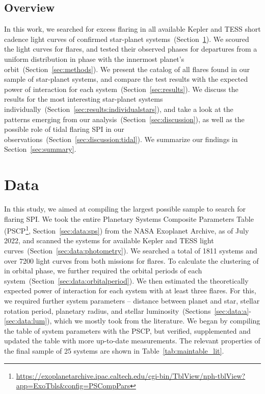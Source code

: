 \documentclass[twocolumn]{aastex631}
\begin{document}
\subsection{Overview}
In this work, we searched for excess flaring in all available Kepler and TESS short cadence light curves of confirmed star-planet systems~(Section~\ref{sec:data}). We scoured the light curves for flares, and tested their observed phases for departures from a uniform distribution in phase with the innermost planet's orbit~(Section~\ref{sec:methods}). We present the catalog of all flares found in our sample of star-planet systems, and compare the test results with the expected power of interaction for each system~(Section~\ref{sec:results}). We discuss the results for the most interesting star-planet systems individually~(Section~\ref{sec:results:individualstars}), and take a look at the patterns emerging from our analysis~(Section~\ref{sec:discussion}), as well as the possible role of tidal flaring SPI in our observations~(Section~\ref{sec:discussion:tidal}).  We summarize our findings in Section~\ref{sec:summary}. 




\section{Data}
\label{sec:data}
In this study, we aimed at compiling the largest possible sample to search for flaring SPI. We took the entire Planetary Systems Composite Parameters Table (PSCP\footnote{ \url{https://exoplanetarchive.ipac.caltech.edu/cgi-bin/TblView/nph-tblView?app=ExoTbls&config=PSCompPars}}, Section~\ref{sec:data:sps}) from the NASA Exoplanet Archive, as of July 2022, and scanned the systems for available Kepler and TESS light curves~(Section~\ref{sec:data:photometry}). We searched a total of 1811 systems and over 7200 light curves from both missions for flares. To calculate the clustering of in orbital phase, we further required the orbital periods of each system~(Section~\ref{sec:data:orbitalperiod}). We then estimated the theoretically expected power of interaction for each system with at least three flares. For this, we required further system parameters -- distance between planet and star, stellar rotation period, planetary radius, and stellar luminosity~(Sections~\ref{sec:data:a}-\ref{sec:data:lum}), which we mostly took from the literature. We began by compiling the table of system parameters with the PSCP, but verified, supplemented and updated the table with more up-to-date measurements. The relevant properties of the final sample of 25 systems are shown in Table~\ref{tab:maintable_lit}.
\end{document}
